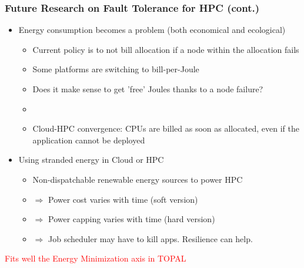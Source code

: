 \begin{frame}
  \frametitle{Future Research on Fault Tolerance for HPC (cont.)}

  \begin{itemize}
  \item Energy consumption becomes a problem (both economical and ecological)
    \begin{itemize}
    \item Current policy is to not bill allocation if a node within the allocation fails
    \item Some platforms are switching to bill-per-Joule
    \item Does it make sense to get 'free' Joules thanks to a node failure?
    \item[] ~
    \item Cloud-HPC convergence: CPUs are billed as soon as allocated, even if the application cannot be deployed
    \end{itemize}
  \item Using stranded energy in Cloud or HPC
    \begin{itemize}
    \item Non-dispatchable renewable energy sources to power HPC
    \item $\Rightarrow$ Power cost varies with time (soft version)
    \item $\Rightarrow$ Power capping varies with time (hard version)
    \item $\Rightarrow$ Job scheduler may have to kill apps. Resilience can help.
    \end{itemize}
  \end{itemize}
  \begin{center}
    \textcolor{red}{Fits well the Energy Minimization axis in TOPAL}
  \end{center}
\end{frame}



